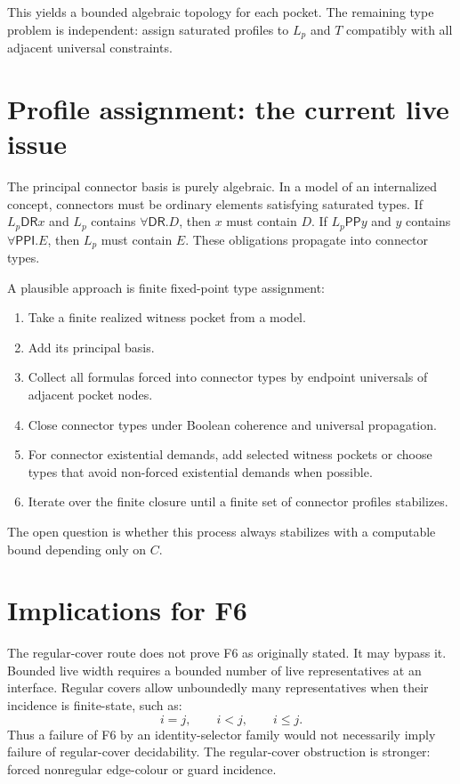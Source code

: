 \documentclass[11pt]{article}
\newcommand{\PP}{\mathsf{PP}}
\newcommand{\PPI}{\mathsf{PPI}}
\newcommand{\DR}{\mathsf{DR}}
\begin{document}
This yields a bounded algebraic topology for each pocket. The remaining type problem is independent: assign saturated profiles to $L_p$ and $T$ compatibly with all adjacent universal constraints.

\section{Profile assignment: the current live issue}

The principal connector basis is purely algebraic. In a model of an internalized concept, connectors must be ordinary elements satisfying saturated types. If $L_p\DR x$ and $L_p$ contains $\forall\DR.D$, then $x$ must contain $D$. If $L_p\PP y$ and $y$ contains $\forall\PPI.E$, then $L_p$ must contain $E$. These obligations propagate into connector types.

A plausible approach is finite fixed-point type assignment:
\begin{enumerate}[label=(\arabic*)]
\item Take a finite realized witness pocket from a model.
\item Add its principal basis.
\item Collect all formulas forced into connector types by endpoint universals of adjacent pocket nodes.
\item Close connector types under Boolean coherence and universal propagation.
\item For connector existential demands, add selected witness pockets or choose types that avoid non-forced existential demands when possible.
\item Iterate over the finite closure until a finite set of connector profiles stabilizes.
\end{enumerate}
The open question is whether this process always stabilizes with a computable bound depending only on $C$.

\section{Implications for F6}

The regular-cover route does not prove F6 as originally stated. It may bypass it. Bounded live width requires a bounded number of live representatives at an interface. Regular covers allow unboundedly many representatives when their incidence is finite-state, such as:
\[
i=j,
\qquad
 i<j,
\qquad
 i\le j.
\]
Thus a failure of F6 by an identity-selector family would not necessarily imply failure of regular-cover decidability. The regular-cover obstruction is stronger: forced nonregular edge-colour or guard incidence.
\end{document}
